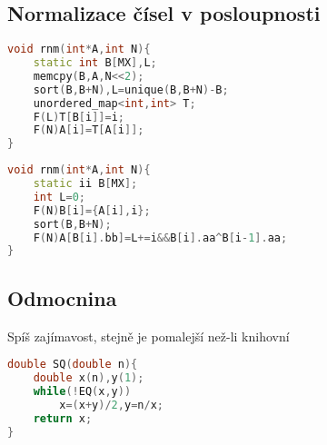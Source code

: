 \documentclass[11pt]{article}
\begin{document}
\subsection{Normalizace čísel v posloupnosti}
\begin{lstlisting}[language=C++]
void rnm(int*A,int N){
    static int B[MX],L;
    memcpy(B,A,N<<2);
    sort(B,B+N),L=unique(B,B+N)-B;
    unordered_map<int,int> T;
    F(L)T[B[i]]=i;
    F(N)A[i]=T[A[i]];
}
\end{lstlisting}
\begin{lstlisting}[language=C++]
void rnm(int*A,int N){
    static ii B[MX];
    int L=0;
    F(N)B[i]={A[i],i};
    sort(B,B+N);
    F(N)A[B[i].bb]=L+=i&&B[i].aa^B[i-1].aa;
}
\end{lstlisting}
\subsection{Odmocnina}
Spíš zajímavost, stejně je pomalejší než-li knihovní
\begin{lstlisting}[language=C++]
double SQ(double n){
    double x(n),y(1);
    while(!EQ(x,y))
        x=(x+y)/2,y=n/x;
    return x;
}
\end{lstlisting}
\end{document}
